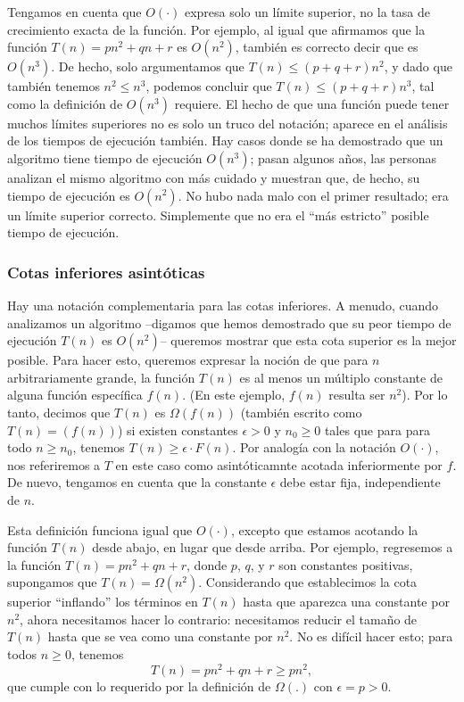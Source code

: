 \documentclass[a4paper, 12pt]{book}
\theoremstyle{dotless}
\begin{document}
Tengamos en cuenta que $O(\cdot)$ expresa solo un límite superior, no la tasa de crecimiento exacta de la función. 
Por ejemplo, al igual que afirmamos que la función $T(n) = pn^2 + qn + r$ es $O(n^2)$, también es correcto decir que es $O(n^3)$. De hecho, solo argumentamos que $T(n) \leq (p + q + r) n^2$, y dado que también tenemos $n^2 \leq n^3$, podemos concluir que $T(n) \leq (p + q + r) n^3$, tal como la definición de $O(n^3)$ requiere. El hecho de que una función puede tener muchos límites superiores no es solo un truco del notación; aparece en el análisis de los tiempos de ejecución también. Hay casos donde se ha demostrado que un algoritmo tiene tiempo de ejecución $O(n^3)$; pasan algunos años, las personas analizan el mismo algoritmo con más cuidado y muestran que, de hecho, su tiempo de ejecución es $O(n^2)$. No hubo nada malo con el primer resultado; era un límite superior correcto. Simplemente que no era el ``más estricto'' posible tiempo de ejecución. 

\subsubsection*{Cotas inferiores asintóticas}

Hay una notación complementaria para las cotas inferiores. A menudo, cuando analizamos un algoritmo --digamos que hemos demostrado que su peor tiempo de ejecución $T(n)$ es $O(n^2)$-- queremos mostrar que esta cota superior es la mejor posible. Para hacer esto, queremos expresar la noción de que para $n$ arbitrariamente grande, la función $T(n)$ es al menos un múltiplo constante de alguna función específica $f(n)$. (En este ejemplo, $f(n)$ resulta ser $n^2$). Por lo tanto, decimos que $T(n)$ es $\Omega(f(n))$ (también escrito como $T(n)=(f(n))$) si existen constantes $\epsilon > 0$ y $n_0 \geq 0$ tales que para para todo $n \geq n_0$, tenemos $T(n) \geq \epsilon \cdot F(n)$. Por analogía con la notación  $O(\cdot)$, nos referiremos a $T$ en este caso como asintóticamnte acotada inferiormente por $f$. De nuevo, tengamos en cuenta que la constante $\epsilon$ debe estar fija, independiente de $n$.

Esta definición funciona igual que $O(\cdot)$, excepto que estamos acotando la función $T(n)$ desde abajo, en lugar que desde arriba. Por ejemplo, regresemos a la función $T(n) = pn^2+ qn + r$,  donde $p$, $q$, y $r$ son constantes positivas, supongamos que $T(n)=\Omega(n^2)$. Considerando que establecimos la cota superior ``inflando'' los términos en $T(n)$ hasta que aparezca una constante por $n^2$, ahora necesitamos hacer lo contrario: necesitamos reducir el tamaño de $T(n)$ hasta que se vea como una constante por $n^2$. No es difícil hacer esto; para todos $n \geq 0$, tenemos 
%
$$T(n) = pn^2 + qn + r ≥ pn^2,$$
%
que cumple con lo requerido por la definición de $\Omega(.)$ con $\epsilon = p > 0$. 
\end{document}
